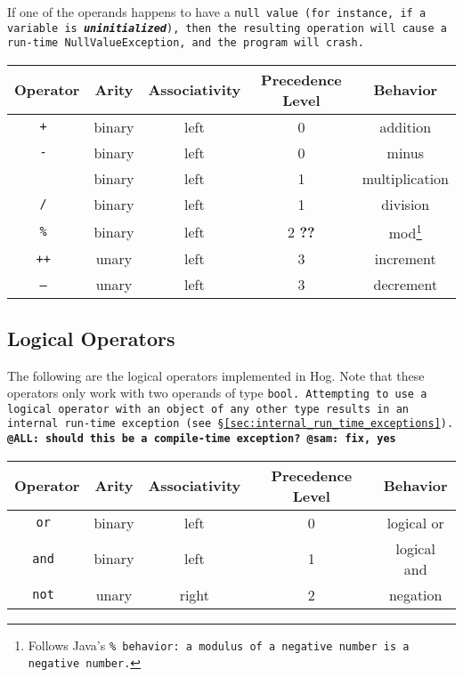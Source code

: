\documentclass{book}
\begin{document}
If one of the operands happens to have a \tt null \rm value (for instance, if a variable is \textbf{\emph{uninitialized}}),
then the resulting operation will cause a run-time \tt NullValueException\rm, and the program will crash.

\begin{center}
\begin{tabular}{|c|c|c|c|c|}

\hline \textbf{Operator} & \textbf{Arity} & \textbf{Associativity} &
\textbf{Precedence Level} & \textbf{Behavior} \\ \hline
\tt + \rm & binary & left & 0 & addition \\ \hline
\tt - \rm & binary & left & 0 & minus \\ \hline
\tt * \rm & binary & left & 1 & multiplication \\ \hline
\tt / \rm & binary & left & 1 & division \\ \hline
\tt \% \rm & binary & left & 2 \textbf{??} & mod\footnote{Follows Java's 
\tt \% \rm behavior: a modulus of a negative number is a negative number.} \\ 
\hline
\tt ++ \rm & unary & left & 3 & increment \\ \hline
\tt -- \rm & unary & left & 3 & decrement \\ \hline
\end{tabular}
\end{center}


\subsection{Logical Operators} %
\label{sub:logical_operators}

The following are the logical operators implemented in Hog. Note that these
operators only work with two operands of type \tt bool\rm. Attempting to use a
logical operator with an object of any other type results in an internal run-time
exception (see \S \ref{sec:internal_run_time_exceptions}). \textbf{@ALL: should
this be a compile-time exception?} \textbf{@sam: fix, yes}

\begin{center}
\begin{tabular}{|c|c|c|c|c|}

\hline \textbf{Operator} & \textbf{Arity} & \textbf{Associativity} &
\textbf{Precedence Level} & \textbf{Behavior} \\ \hline
\tt or \rm & binary & left & 0 & logical or \\ \hline
\tt and \rm & binary & left & 1 & logical and \\ \hline
\tt not \rm & unary & right & 2 & negation \\ \hline
\end{tabular}
\end{center}
\end{document}
